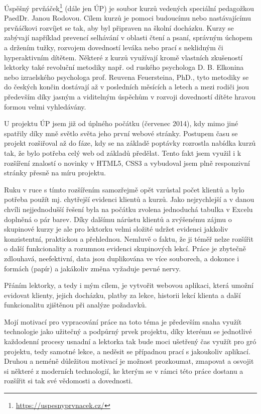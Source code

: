 Úspěšný prvňáček\footnote{\url{https://uspesnyprvnacek.cz/}} (dále jen ÚP) je soubor kurzů vedených speciální pedagožkou PaedDr. Janou Rodovou. Cílem kurzů je pomoci budoucímu nebo nastávajícímu prvňáčkovi rozvíjet se tak, aby byl připraven na školní docházku. Kurzy se zabývají například prevencí selhávání v oblasti čtení a psaní, správným úchopem a držením tužky, rozvojem dovedností leváka nebo prací s neklidným či hyperaktivním dítětem. Některé z kurzů využívají kromě vlastních zkušeností lektorky také revoluční metodiky např. od ruského psychologa D. B. Elkonina nebo izraelského psychologa prof. Reuvena Feuersteina, PhD., tyto metodiky se do českých končin dostávají až v posledních měsících a letech a mezi rodiči jsou především díky jasným a viditelným úspěchům v rozvoji dovedností dítěte hravou formou velmi vyhledávány.

U projektu ÚP jsem již od úplného počátku (červenec 2014), kdy mimo jiné spatřily díky mně světlo světa jeho první webové stránky. Postupem času se projekt rozšiřoval až do fáze, kdy se na základě poptávky rozrostla nabídka kurzů tak, že bylo potřeba celý web od základů předělat. Tento fakt jsem využil i k rozšíření znalostí o novinky v HTML5, CSS3 a vybudoval jsem plně responzivní stránky přesně na míru projektu.

Ruku v ruce s tímto rozšířením samozřejmě opět vzrůstal počet klientů a bylo potřeba použít mj. chytřejší evidenci klientů a kurzů. Jako nejrychlejší a v danou chvíli nejjednodušší řešení byla na počátku zvolena jednoduchá tabulka v Excelu doplněná o pár barev. Díky dalšímu nárůstu klientů a zvýšenému zájmu o skupinové kurzy je ale pro lektorku velmi složité udržet evidenci jakkoliv konzistentní, praktickou a přehlednou. Nemluvě o faktu, že ji téměř nelze rozšířit o další funkcionality a rozumnou evidenci skupinových lekcí. Práce je zbytečně zdlouhavá, neefektivní, data jsou duplikována ve více souborech, a dokonce i formách (papír) a jakákoliv změna vyžaduje pevné nervy.

Přáním lektorky, a tedy i mým cílem, je vytvořit webovou aplikaci, která umožní evidovat klienty, jejich docházku, platby za lekce, historii lekcí klienta a další funkcionalitu zjištěnou při analýze požadavků.

Mojí motivací pro vypracování práce na toto téma je především snaha využít technologie jako užitečný a podpůrný prvek projektu, díky kterému se jednotlivé každodenní procesy usnadní a lektorka tak bude moci ušetřený čas využít pro gró projektu, tedy samotné lekce, a neděsit se případnou prací s jakoukoliv aplikací. Druhou a neméně důležitou motivací je možnost prozkoumat, zmapovat a osvojit si některé z moderních technologií, ke kterým se v rámci této práce dostanu a rozšířit si tak své vědomosti a dovednosti.

